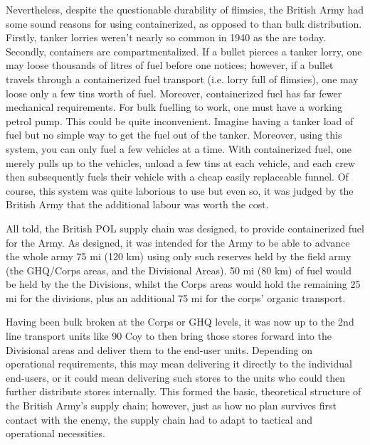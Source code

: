\documentclass[noraggedright]{turabian-researchpaper}
\newcommand{\SupInWar}{Precis on Lecture ``Supplies in War'', (Part II)}
\begin{document}

Nevertheless, despite the questionable durability of flimsies, the British 
Army had some sound reasons for using containerized, as opposed to than bulk 
distribution.  Firstly, tanker lorries weren't nearly so common in 1940 as the 
are today.%
Secondly,
containers are compartmentalized.  If a bullet pierces a tanker lorry, one may
loose thousands of litres of fuel before one notices; however, if a bullet 
travels through a containerized fuel transport (i.e. lorry full of flimsies),
one may loose only a few tins worth of fuel.%
Moreover, containerized fuel has
far fewer mechanical requirements.  For bulk fuelling to work, one must have a 
working petrol pump.  This could be quite inconvenient.  Imagine having a 
tanker load of fuel but no simple way to get the fuel out of the tanker.  
Moreover, using this system, you can only fuel a few vehicles at a time.  
With containerized fuel, one merely pulls up to the vehicles, unload a few
tins at each vehicle, and each crew then subsequently fuels their vehicle
with a cheap easily replaceable funnel.  Of course, this system was quite 
laborious to use but even so, it was judged by the British Army that the 
additional labour was worth the cost.  %

All told, the British POL supply chain was designed, to provide containerized
fuel for the Army.  As designed, it was intended for the Army to be able to
advance the whole army 75 mi (120 km) using only such reserves held by the 
field army (the GHQ/Corps areas, and the Divisional Areas).  50 mi (80 km) 
of fuel would be held by the the Divisions, whilst the Corps areas would hold
the remaining 25 mi for the divisions, plus an additional 75 mi for the corps'
organic transport.\autocite[\SupInWar][3]{27course}

Having been bulk broken at the Corps or GHQ levels, it was now up to the 2nd
line transport units like 90 Coy to then bring those stores forward into the
Divisional areas and deliver them to the end-user units.  Depending on 
operational requirements, this may mean delivering it directly to the 
individual end-users, or it could mean delivering such stores to the units who 
could then further distribute stores internally.  This formed the basic, 
theoretical structure of the British Army's supply chain; however, just as how
no plan survives first contact with the enemy, the supply chain had to adapt
to tactical and operational necessities.  
\end{document}
